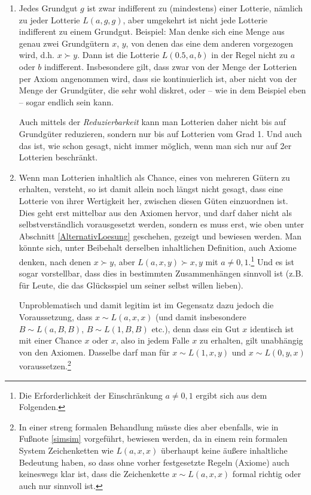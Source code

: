 \documentclass[10pt, a4paper, german]{article}
\numberwithin {equation}{section}
\begin{document}
\begin{enumerate}
  \item Jedes Grundgut $g$ ist zwar indifferent zu (mindestens) einer Lotterie,
  nämlich zu jeder Lotterie $L(a,g,g)$, aber umgekehrt ist nicht jede Lotterie
  indifferent zu einem Grundgut. Beispiel: Man denke sich eine Menge aus
  genau zwei Grundgütern $x$, $y$, von denen das eine dem anderen vorgezogen
  wird, d.h. $x \succ y$. Dann ist die Lotterie $L(0.5,a,b)$ in der Regel nicht
  zu $a$ oder $b$ indifferent. Insbesondere gilt, dass zwar von der Menge der
  Lotterien per Axiom angenommen wird, dass sie kontinuierlich ist, aber nicht
  von der Menge der Grundgüter, die sehr wohl diskret, oder -- wie in dem
  Beispiel eben -- sogar endlich sein kann.

  Auch mittels der {\em Reduzierbarkeit} kann man Lotterien daher nicht bis auf
  Grundgüter reduzieren, sondern nur bis auf Lotterien vom Grad 1. Und auch das
  ist, wie schon gesagt, nicht immer möglich, wenn man sich nur auf 2er
  Lotterien beschränkt.

  \item Wenn man Lotterien inhaltlich als Chance, eines von mehreren Gütern zu
  erhalten, versteht, so ist damit allein noch längst nicht gesagt, dass eine
  Lotterie von ihrer Wertigkeit her, zwischen diesen Güten einzuordnen ist. Dies
  geht erst mittelbar aus den Axiomen hervor, und darf daher nicht als
  selbstverständlich vorausgesetzt werden, sondern es muss erst, wie oben unter
  Abschnitt \ref{AlternativLoesung} geschehen, gezeigt und bewiesen werden. Man
  könnte sich, unter Beibehalt derselben inhaltlichen Definition, auch Axiome
  denken, nach denen $x \succ y$, aber $L(a,x,y) \succ x,y$ mit $a \neq
  0,1$.\footnote{Die Erforderlichkeit der Einschränkung $a \neq 0,1$ ergibt sich
  aus dem Folgenden.} Und es ist sogar vorstellbar, dass dies in bestimmten
  Zusammenhängen sinnvoll ist (z.B. für Leute, die das Glücksspiel um seiner
  selbst willen lieben).
  
  Unproblematisch und damit legitim ist im Gegensatz dazu jedoch die
  Voraussetzung, dass $x \sim L(a,x,x)$ (und damit insbesondere $B \sim
  L(a,B,B)$, $B \sim L(1,B,B)$ etc.), denn dass ein Gut $x$ identisch ist mit
  einer Chance $x$ oder $x$, also in jedem Falle $x$ zu erhalten, gilt
  unabhängig von den Axiomen. Dasselbe darf man für $x
  \sim L(1,x,y)$ und $x \sim L(0,y,x)$ voraussetzen.\footnote{In einer streng
  formalen Behandlung müsste dies aber ebenfalls, wie in Fußnote \ref{simsim}
  vorgeführt, bewiesen werden, da in einem rein formalen System Zeichenketten wie
  $L(a,x,x)$ überhaupt keine äußere inhaltliche Bedeutung haben, so dass ohne
  vorher festgesetzte Regeln (Axiome) auch keineswegs klar ist, dass die
  Zeichenkette $x \sim L(a,x,x)$ formal richtig oder auch nur sinnvoll ist.}  

\end{enumerate}
\end{document}
